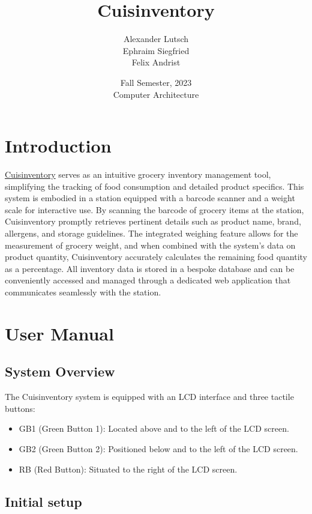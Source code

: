 \documentclass{article}
\author{Alexander Lutsch\\Ephraim Siegfried\\Felix Andrist}
\title{ \Huge Cuisinventory }
\date{Fall Semester, 2023 \\ Computer Architecture}
\begin{document}
\maketitle

\section{Introduction}
\href{https://github.com/EphraimSiegfried/cuisinventory}{Cuisinventory} serves as an intuitive grocery inventory management tool, simplifying the tracking of food consumption and detailed product specifics. This system is embodied in a station equipped with a barcode scanner and a weight scale for interactive use. By scanning the barcode of grocery items at the station, Cuisinventory promptly retrieves pertinent details such as product name, brand, allergens, and storage guidelines. The integrated weighing feature allows for the measurement of grocery weight, and when combined with the system's data on product quantity, Cuisinventory accurately calculates the remaining food quantity as a percentage. All inventory data is stored in a bespoke database and can be conveniently accessed and managed through a dedicated web application that communicates seamlessly with the station.

\section{User Manual}

\subsection{System Overview}
The Cuisinventory system is equipped with an LCD interface and three tactile buttons:
\begin{itemize}
	\item GB1 (Green Button 1): Located above and to the left of the LCD screen.
	\item GB2 (Green Button 2): Positioned below and to the left of the LCD screen.
	\item RB (Red Button): Situated to the right of the LCD screen.
\end{itemize}

\subsection{Initial setup}
\end{document}
